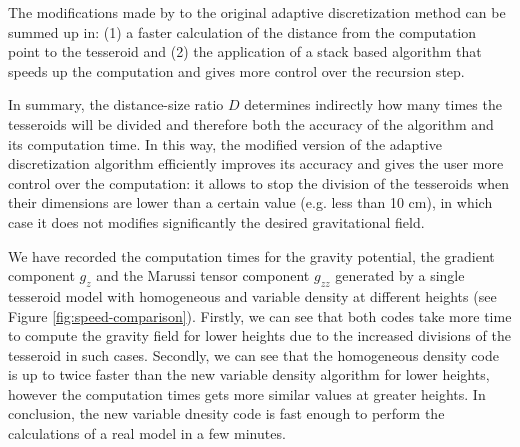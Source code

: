 \documentclass[extra]{gji}
\begin{document}
The modifications made by \citet{Uieda2016} to the original adaptive discretization method \citep{Li2011} can be summed up in:
(1) a faster calculation of the distance from the computation point to the tesseroid and 
(2) the application of a stack based algorithm that speeds up the computation and gives more control over the recursion step.

In summary, the distance-size ratio $D$ determines indirectly how many times the tesseroids will be divided and therefore both the accuracy of the algorithm and its computation time.
In this way, the modified version of the adaptive discretization algorithm efficiently improves its accuracy and gives the user more control over the computation: it allows to stop the division of the tesseroids when their dimensions are lower than a certain value (e.g. less than 10 cm), in which case it does not modifies significantly the desired gravitational field.

We have recorded the computation times for the gravity potential, the gradient component $g_z$ and the Marussi tensor component $g_{zz}$ generated by a single tesseroid model with homogeneous and variable density at different heights (see Figure \ref{fig:speed-comparison}).
Firstly, we can see that both codes take more time to compute the gravity field for lower heights due to the increased divisions of the tesseroid in such cases.
Secondly, we can see that the homogeneous density code is up to twice faster than the new variable density algorithm for lower heights, however the computation times gets more similar values at greater heights. In conclusion, the new variable dnesity code is fast enough to perform the calculations of a real model in a few minutes. 
\end{document}
